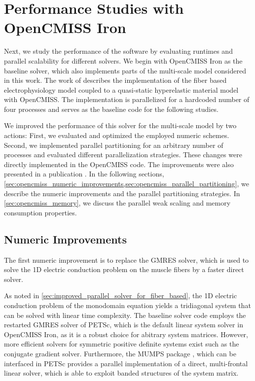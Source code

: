 

\section{Performance Studies with OpenCMISS Iron}

Next, we study the performance of the software by evaluating runtimes and parallel scalability for different solvers.
We begin with OpenCMISS Iron as the baseline solver, which also implements parts of the multi-scale model considered in this work. The work of \cite{Heidlauf2013} describes the implementation of the fiber based electrophysiology model coupled to a quasi-static hyperelastic material model with OpenCMISS. The implementation is parallelized for a hardcoded number of four processes and serves as the baseline code for the following studies.

We improved the performance of this solver for the multi-scale model by two actions: First, we evaluated and optimized the employed numeric schemes. Second, we implemented parallel partitioning for an arbitrary number of processes and evaluated different parallelization strategies.
These changes were directly implemented in the OpenCMISS code. The improvements were also presented in a publication \cite{Bradley:2018:EDB}. In the following sections, \cref{sec:opencmiss_numeric_improvements,sec:opencmiss_parallel_partitioning}, we describe the numeric improvements and the parallel partitioning strategies. In \cref{sec:opencmiss_memory}, we discuss the parallel weak scaling and memory consumption properties.

\subsection{Numeric Improvements}\label{sec:opencmiss_numeric_improvements}

The first numeric improvement is to replace the GMRES solver, which is used to solve the 1D electric conduction problem on the muscle fibers
by a faster direct solver. 

As noted in \cref{sec:improved_parallel_solver_for_fiber_based}, the 1D electric conduction problem of the monodomain equation yields a tridiagonal system that can be solved with linear time complexity. The baseline solver code employs the restarted GMRES solver of PETSc, which is the default linear system solver in OpenCMISS Iron, as it is a robust choice for abitrary system matrices. 
However, more efficient solvers for symmetric positive definite systems exist such as the conjugate gradient solver. 
Furthermore, the MUMPS package \cite{mumps2001}, which can be interfaced in PETSc provides a parallel implementation of a direct, multi-frontal linear solver, which is able to exploit banded structures of the system matrix.

